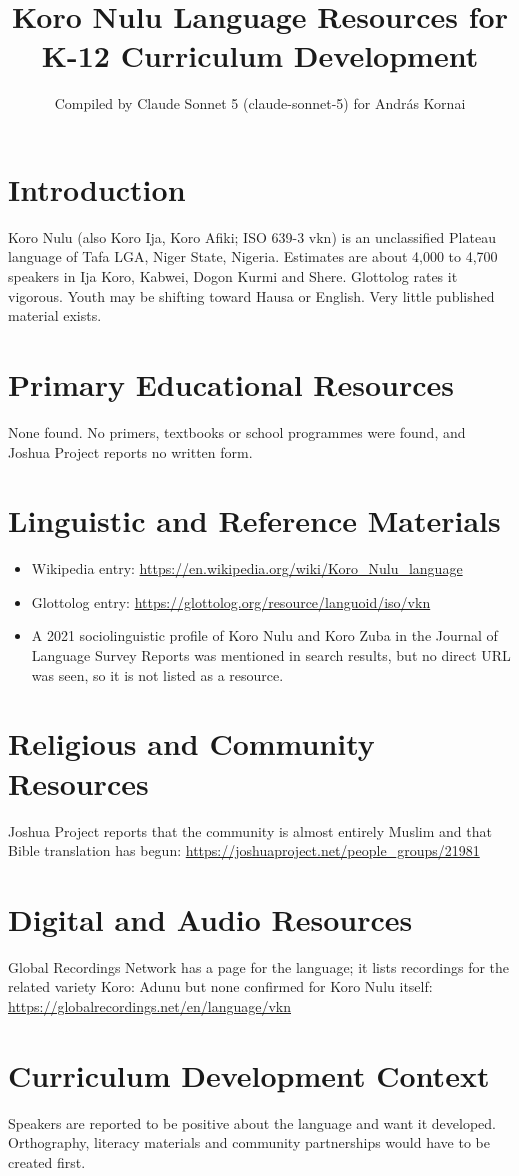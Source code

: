 \documentclass[12pt]{article}
\title{Koro Nulu Language Resources for K-12 Curriculum Development}
\author{Compiled by Claude Sonnet 5 (claude-sonnet-5) for Andr\'as Kornai}
\date{}
\begin{document}
\maketitle
\section{Introduction}
Koro Nulu (also Koro Ija, Koro Afiki; ISO 639-3 vkn) is an unclassified Plateau language of Tafa LGA, Niger State, Nigeria. Estimates are about 4,000 to 4,700 speakers in Ija Koro, Kabwei, Dogon Kurmi and Shere. Glottolog rates it vigorous. Youth may be shifting toward Hausa or English. Very little published material exists.
\section{Primary Educational Resources}
None found. No primers, textbooks or school programmes were found, and Joshua Project reports no written form.
\section{Linguistic and Reference Materials}
\begin{itemize}
\item Wikipedia entry: \url{https://en.wikipedia.org/wiki/Koro_Nulu_language}
\item Glottolog entry: \url{https://glottolog.org/resource/languoid/iso/vkn}
\item A 2021 sociolinguistic profile of Koro Nulu and Koro Zuba in the Journal of Language Survey Reports was mentioned in search results, but no direct URL was seen, so it is not listed as a resource.
\end{itemize}
\section{Religious and Community Resources}
Joshua Project reports that the community is almost entirely Muslim and that Bible translation has begun: \url{https://joshuaproject.net/people_groups/21981}
\section{Digital and Audio Resources}
Global Recordings Network has a page for the language; it lists recordings for the related variety Koro: Adunu but none confirmed for Koro Nulu itself: \url{https://globalrecordings.net/en/language/vkn}
\section{Curriculum Development Context}
Speakers are reported to be positive about the language and want it developed. Orthography, literacy materials and community partnerships would have to be created first.
\end{document}
